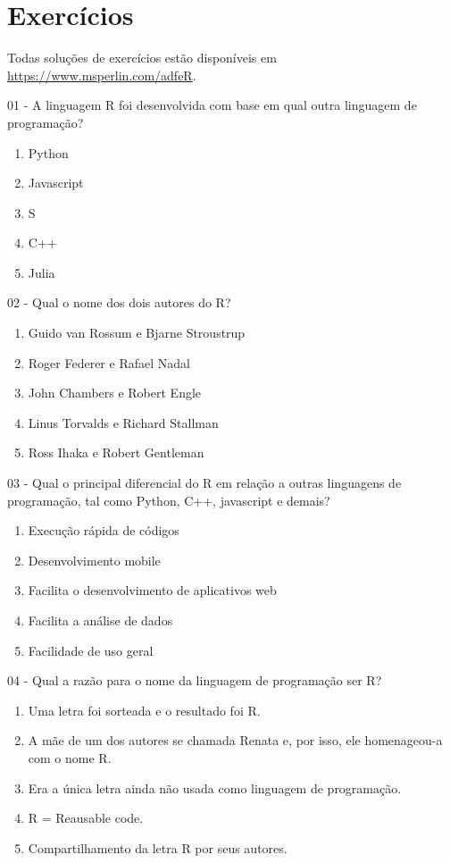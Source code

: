 \documentclass[
  11pt,
]{book}
\providecommand{\tightlist}{%
  \setlength{\itemsep}{0pt}\setlength{\parskip}{0pt}}
\begin{document}
\hypertarget{exercuxedcios}{%
\section{Exercícios}\label{exercuxedcios}}

Todas soluções de exercícios estão disponíveis em \url{https://www.msperlin.com/adfeR}.

01 -
A linguagem R foi desenvolvida com base em qual outra linguagem de programação?

\begin{enumerate}
\def\labelenumi{\alph{enumi})}
\tightlist
\item
  Python
\item
  Javascript
\item
  S
\item
  C++
\item
  Julia
\end{enumerate}

02 -
Qual o nome dos dois autores do R?

\begin{enumerate}
\def\labelenumi{\alph{enumi})}
\tightlist
\item
  Guido van Rossum e Bjarne Stroustrup
\item
  Roger Federer e Rafael Nadal
\item
  John Chambers e Robert Engle
\item
  Linus Torvalds e Richard Stallman
\item
  Ross Ihaka e Robert Gentleman
\end{enumerate}

03 -
Qual o principal diferencial do R em relação a outras linguagens de programação, tal como Python, C++, javascript e demais?

\begin{enumerate}
\def\labelenumi{\alph{enumi})}
\tightlist
\item
  Execução rápida de códigos
\item
  Desenvolvimento mobile
\item
  Facilita o desenvolvimento de aplicativos web
\item
  Facilita a análise de dados
\item
  Facilidade de uso geral
\end{enumerate}

04 -
Qual a razão para o nome da linguagem de programação ser R?

\begin{enumerate}
\def\labelenumi{\alph{enumi})}
\tightlist
\item
  Uma letra foi sorteada e o resultado foi R.
\item
  A mãe de um dos autores se chamada Renata e, por isso, ele homenageou-a com o nome R.
\item
  Era a única letra ainda não usada como linguagem de programação.
\item
  R = Reausable code.
\item
  Compartilhamento da letra R por seus autores.
\end{enumerate}
\end{document}
